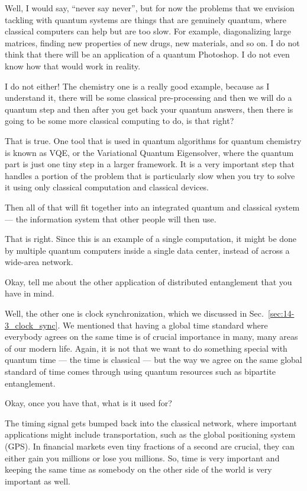 \mmm Well, I would say, ``never say never'', but for now the problems that we envision tackling with quantum systems are things that are genuinely quantum, where classical computers can help but are too slow. For example, diagonalizing large matrices, finding new properties of new drugs, new materials, and so on. I do not think that there will be an application of a quantum Photoshop. I do not even know how that would work in reality.

\rrr I do not either! The chemistry one is a really good example, because as I understand it, there will be some classical pre-processing and then we will do a quantum step and then after you get back your quantum answers, then there is going to be some more classical computing to do, is that right?

\mmm That is true. One tool that is used in quantum algorithms for quantum chemistry is known as VQE, or the Variational Quantum Eigensolver, where the quantum part is just one tiny step in a larger framework. It is a very important step that handles a portion of the problem that is particularly slow when you try to solve it using only classical computation and classical devices.

\rrr Then all of that will fit together into an integrated quantum and classical system --- the information system that other people will then use.

\mmm That is right. Since this is an example of a single computation, it might be done by multiple quantum computers inside a single data center, instead of across a wide-area network.

\rrr Okay, tell me about the other application of distributed entanglement that you have in mind.

\mmm Well, the other one is clock synchronization, which we discussed in Sec.~\ref{sec:14-3_clock_sync}. We mentioned that having a global time standard where everybody agrees on the same time is of crucial importance in many, many areas of our modern life. Again, it is not that we want to do something special with quantum time --- the time is classical --- but the way we agree on the same global standard of time comes through using quantum resources such as bipartite entanglement.

\rrr Okay, once you have that, what is it used for?

\mmm The timing signal gets bumped back into the classical network, where important applications might include transportation, such as the global positioning system (GPS). In financial markets even tiny fractions of a second are crucial, they can either gain you millions or lose you millions. So, time is very important and keeping the same time as somebody on the other side of the world is very important as well.


